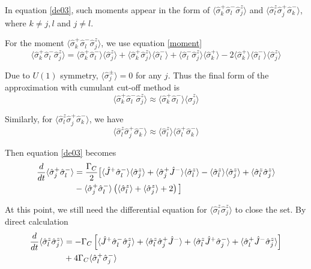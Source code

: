 \documentclass{article}
\newcommand{\gc}{\Gamma_C}
\begin{document}
In equation \ref{de03}, such moments appear in the form of $\langle \hat{\sigma}_k^+\hat{\sigma}_l^-\hat{\sigma}_j^z\rangle$ and $\langle \hat{\sigma}^z_l\hat{\sigma}^+_j\hat{\sigma}_k^-\rangle$, where $k\neq j, l$ and $j\neq l$.

For the moment $\langle \hat{\sigma}_k^+\hat{\sigma}_l^-\hat{\sigma}_j^z\rangle$, we use equation \ref{moment}
\begin{equation}
    \langle \hat{\sigma}_k^+\hat{\sigma}_l^-\hat{\sigma}_j^z\rangle = \langle \hat{\sigma}_k^+ \hat{\sigma}_l^- \rangle \langle \hat{\sigma}_j^z\rangle+\langle \hat{\sigma}_k^+ \hat{\sigma}_j^z \rangle \langle \hat{\sigma}_l^-\rangle+\langle\hat{\sigma}_l^-\hat{\sigma}_j^z \rangle \langle \hat{\sigma}_k^+\rangle
    -2\langle \hat{\sigma}_k^+ \rangle \langle \hat{\sigma}_l^-\rangle \langle  \hat{\sigma}_j^z \rangle
\end{equation}

Due to $U(1)$ symmetry, $\langle\hat{\sigma}^\pm_j\rangle=0$ for any $j$. Thus the final form of the approximation with cumulant cut-off method is
\begin{equation}
    \langle \hat{\sigma}_k^+\hat{\sigma}_l^-\hat{\sigma}_j^z\rangle \approx \langle \hat{\sigma}_k^+ \hat{\sigma}_l^- \rangle \langle \hat{\sigma}_j^z\rangle
\end{equation}

Similarly, for $\langle \hat{\sigma}^z_l\hat{\sigma}^+_j\hat{\sigma}_k^-\rangle$, we have
\begin{equation}
    \langle \hat{\sigma}^z_l\hat{\sigma}^+_j\hat{\sigma}_k^-\rangle \approx \langle \hat{\sigma}_l^z\rangle \langle\hat{\sigma}_l^+ \hat{\sigma}_k^-\rangle
\end{equation}

Then equation \ref{de03} becomes
\begin{align}
\notag
\frac{d}{dt}\langle\hat{\sigma}^+_j\hat{\sigma}^-_l\rangle&=\frac{\gc}{2}\big[\langle\hat{J}^+\hat{\sigma}_l^-\rangle \langle \hat{\sigma}_j^z\rangle+\langle\hat{\sigma}^+_j\hat{J}^-\rangle \langle \hat{\sigma}_l^z\rangle-\langle\hat{\sigma}_l^z\rangle \langle \hat{\sigma}_j^z\rangle+\langle\hat{\sigma}_l^z \hat{\sigma}_j^z\rangle\\
&-\langle\hat{\sigma}_j^+ \hat{\sigma}_l^-\rangle\left(\langle\hat{\sigma}_l^z\rangle +\langle \hat{\sigma}_j^z\rangle+2\right)\big]
\end{align}

At this point, we still need the differential equation for $\langle\hat{\sigma}_l^z \hat{\sigma}_j^z\rangle$ to close the set. By direct calculation
\begin{align}
\notag
\frac{d}{dt}\langle\hat{\sigma}_l^z \hat{\sigma}_j^z\rangle&=-\gc\left[\langle \hat{J}^+\hat{\sigma}^-_l\hat{\sigma}^z_j\rangle+\langle \hat{\sigma}_l^z\hat{\sigma}^+_j\hat{J}^-\rangle+\langle \hat{\sigma}_l^z\hat{J}^+\hat{\sigma}^-_j\rangle+\langle \hat{\sigma}_l^+\hat{J}^-\hat{\sigma}^z_j\rangle\right]\\
\label{de04}
&+4\gc\langle \hat{\sigma}_l^+\hat{\sigma}^-_j\rangle
\end{align}
\end{document}
